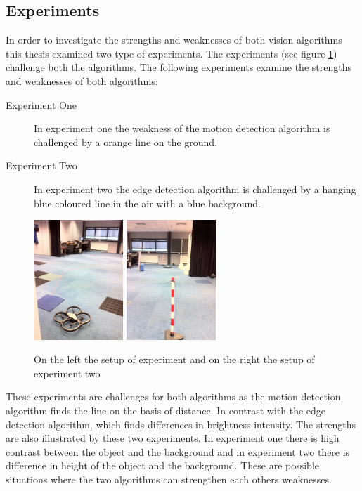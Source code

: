 \documentclass[a4paper]{article}
\begin{document}
\subsection{Experiments}
In order to investigate the strengths and weaknesses of both vision algorithms this thesis examined two type of experiments. The experiments (see figure \ref{experiments}) challenge both the algorithms. The following experiments examine the strengths and weaknesses of both algorithms:
\begin{description}
\item[Experiment One] In experiment one the weakness of the motion detection algorithm is challenged by a orange line on the ground.
\item[Experiment Two] In experiment two the edge detection algorithm is challenged by a hanging blue coloured line in the air with a blue background.
\end{description}
\begin{figure}[!ht]
\centering
\includegraphics[width=0.3\textwidth]{images/experiment1.jpg}
\includegraphics[width=0.3\textwidth]{images/experiment2.jpg}
\caption{On the left the setup of experiment and on the right the setup of experiment two}
\label{experiments}
\end{figure}
These experiments are challenges for both algorithms as the motion detection algorithm finds the line on the basis of distance. In contrast with the edge detection algorithm, which finds differences in brightness intensity. The strengths are also illustrated by these two experiments. In experiment one there is high contrast between the object and the background and in experiment two there is difference in height of the object and the background. These are possible situations where the two algorithms can strengthen each others weaknesses.
\newpage
\end{document}
